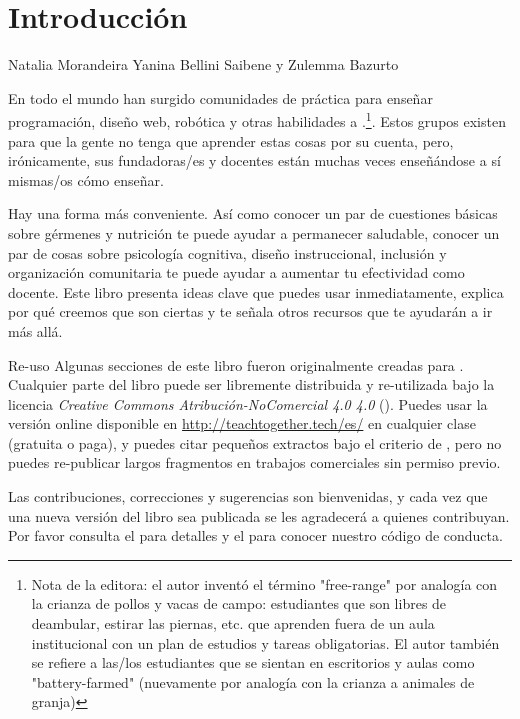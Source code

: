 \chapter{Introducción}\label{s:intro}

\begin{reveiwer}
{Natalia Morandeira}
{Yanina Bellini Saibene y Zulemma Bazurto}
\end{reveiwer}

En todo el mundo han surgido comunidades de práctica
para enseñar programación, diseño web, robótica y otras habilidades 
a .\footnote{Nota de la editora: el autor inventó el término "free-range" 
por analogía con la crianza de pollos y vacas de campo: estudiantes que son libres de deambular, estirar las piernas, etc.
que aprenden fuera de un aula institucional con un plan de estudios y tareas obligatorias. 
El autor también se refiere a las/los estudiantes 
que se sientan en escritorios y aulas como "battery-farmed" 
(nuevamente por analogía con la crianza a animales de granja)}.
Estos grupos existen para que la gente no tenga que aprender estas cosas por su cuenta,
pero, irónicamente,
sus fundadoras/es y docentes están muchas veces enseñándose a sí mismas/os cómo enseñar.

Hay una forma más conveniente.
Así como conocer un par de cuestiones básicas sobre gérmenes y nutrición te puede ayudar a permanecer saludable,
conocer un par de cosas sobre psicología cognitiva,
diseño instruccional,
inclusión
y organización comunitaria
te puede ayudar a aumentar tu efectividad como docente.
Este libro presenta ideas clave que puedes usar inmediatamente,
explica por qué creemos que son ciertas
y te señala otros recursos que te ayudarán a ir más allá.

\begin{aside}{Re-uso}
Algunas secciones de este libro fueron originalmente creadas para
 .
 Cualquier parte del libro puede ser libremente distribuida y re-utilizada
bajo la licencia \emph{Creative Commons Atribución-NoComercial 4.0 4.0}
 ().
Puedes usar la versión online disponible en \url{http://teachtogether.tech/es/} 
en cualquier clase
(gratuita o paga),
y puedes citar pequeños extractos bajo el criterio de ,
pero no puedes re-publicar largos fragmentos en trabajos comerciales sin permiso previo.

Las contribuciones, correcciones y sugerencias son bienvenidas,
y cada vez que una nueva versión del libro sea publicada se les agradecerá a quienes contribuyan.
Por favor consulta el  para detalles
y el  para conocer nuestro código de conducta. 
\end{aside}

